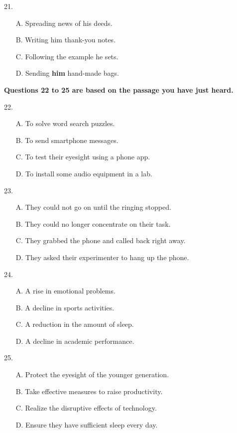 \documentclass[UTF8,11pt]{ctexart}
\begin{document}
21.


\begin{itemize}[leftmargin=2em,itemsep=.2em,topsep=.4em]\item[A.] Spreading news of his deeds.
\item[B.] Writing him thank-you notes.
\item[C.] Following the example he sets.
\item[D.] Sending \textbf{him }hand-made bags.
\end{itemize}

\textbf{Questions 22 to 25 are based on the passage you have just heard.}


22.


\begin{itemize}[leftmargin=2em,itemsep=.2em,topsep=.4em]\item[A.] To solve word search puzzles.
\item[B.] To send smartphone messages.
\item[C.] To test their eyesight using a phone app.
\item[D.] To install some audio equipment in a lab.
\end{itemize}

23.


\begin{itemize}[leftmargin=2em,itemsep=.2em,topsep=.4em]\item[A.] They could not go on until the ringing stopped.
\item[B.] They could no longer concentrate on their task.
\item[C.] They grabbed the phone and called back right away.
\item[D.] They asked their experimenter to hang up the phone.
\end{itemize}

24.


\begin{itemize}[leftmargin=2em,itemsep=.2em,topsep=.4em]\item[A.] A rise in emotional problems.
\item[B.] A decline in sports activities.
\item[C.] A reduction in the amount of sleep.
\item[D.] A decline in academic performance.
\end{itemize}

25.


\begin{itemize}[leftmargin=2em,itemsep=.2em,topsep=.4em]\item[A.] Protect the eyesight of the younger generation.
\item[B.] Take effective measures to raise productivity.
\item[C.] Realize the disruptive effects of technology.
\item[D.] Ensure they have sufficient sleep every day.
\end{itemize}
\end{document}
